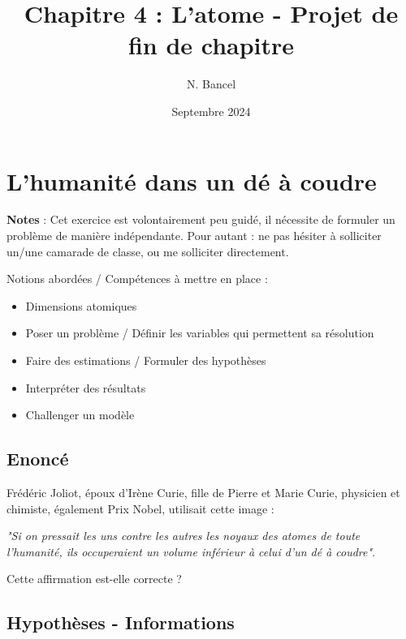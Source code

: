 \documentclass[a4paper,12pt]{article}
\begin{document}
\title{Chapitre 4 : L'atome - Projet de fin de chapitre}
\author{N. Bancel}
\date{Septembre 2024}
\maketitle

\section*{L'humanité dans un dé à coudre}




\begin{tcolorbox}[colback=gray!30, colframe=black]
  \textbf{Notes} : Cet exercice est volontairement peu guidé, il nécessite de formuler un problème de manière indépendante. Pour autant : ne pas hésiter à solliciter un/une camarade de classe, ou me solliciter directement. \par
  \vspace{1em}
  Notions abordées / Compétences à mettre en place :
  \begin{itemize}[noitemsep]
    \item Dimensions atomiques
    \item Poser un problème / Définir les variables qui permettent sa résolution
    \item Faire des estimations / Formuler des hypothèses
    \item Interpréter des résultats
    \item Challenger un modèle 
  \end{itemize}
  \end{tcolorbox}

\subsection*{Enoncé}

Frédéric Joliot, époux d'Irène Curie, fille de Pierre et Marie Curie, physicien et chimiste, également Prix Nobel, utilisait cette image : \par 
\vspace{1em}
\textit{"Si on pressait les uns contre les autres les noyaux des atomes de toute l'humanité, ils occuperaient un volume inférieur à celui d'un dé à coudre"}. \par
\vspace{1em}
Cette affirmation est-elle correcte ?

\subsection*{Hypothèses - Informations}
\end{document}
